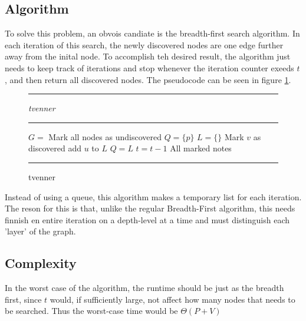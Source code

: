\subsection{Algorithm}

To solve this problem, an obvois candiate is the
breadth-first search algorithm. In each iteration of this
search, the newly discovered nodes are one edge further 
away from the inital node. To accomplish teh desired result, 
the algorithm just needs to keep track of iterations and
stop whenever the iteration counter exeeds $t$, and then
return all discovered nodes. The pseudocode can 
be seen in figure \ref{fig:tvennerpcode}.

\begin{figure}[ht]
\hrule
\vspace{0.2cm}
{\centering  \textit{tvenner}}
\vspace{0.2cm}
\hrule
\begin{algorithmic}
\State $G = $ 
\State Mark all nodes as undiscovered
\State $Q = \{p\}$
\State $L = \{\}$
	\State Mark $v$ as discovered
		\State add $u$ to $L$
	\EndFor
\EndFor
\State $Q = L$
\State $t = t-1$
\EndWhile
\State \Return All marked notes
\EndFunction
\end{algorithmic}
\hrule
\caption{tvenner  \label{fig:tvennerpcode}}
\end{figure}

Instead of using a queue, this algorithm makes a temporary list 
for each iteration. The reson for this is that, unlike the 
regular Breadth-First algorithm, this needs finnish en entire 
iteration on a depth-level at a time and must distinguish 
each 'layer' of the graph.

\subsection{Complexity}

In the worst case of the algorithm, the runtime should be just as
the breadth first, since $t$ would, if sufficiently large, not 
affect how many nodes that needs to be searched. Thus the
worst-case time would be $\Theta \left( P + V \right)$








